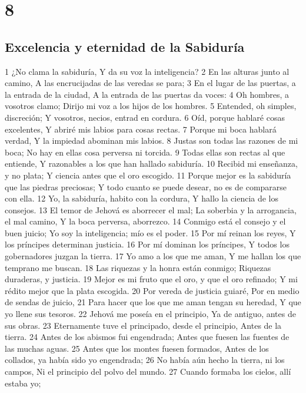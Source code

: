 \chapter{8}

\section*{Excelencia y eternidad de la Sabiduría}

1 ¿No clama la sabiduría,
Y da su voz la inteligencia?
2 En las alturas junto al camino,
A las encrucijadas de las veredas se para;
3 En el lugar de las puertas, a la entrada de la ciudad,
A la entrada de las puertas da voces: 
4 Oh hombres, a vosotros clamo;
Dirijo mi voz a los hijos de los hombres.
5 Entended, oh simples, discreción;
Y vosotros, necios, entrad en cordura.
6 Oíd, porque hablaré cosas excelentes,
Y abriré mis labios para cosas rectas. 
7 Porque mi boca hablará verdad,
Y la impiedad abominan mis labios.
8 Justas son todas las razones de mi boca;
No hay en ellas cosa perversa ni torcida.
9 Todas ellas son rectas al que entiende,
Y razonables a los que han hallado sabiduría.
10 Recibid mi enseñanza, y no plata;
Y ciencia antes que el oro escogido.
11 Porque mejor es la sabiduría que las piedras preciosas;
Y todo cuanto se puede desear, no es de compararse con ella.
12 Yo, la sabiduría, habito con la cordura,
Y hallo la ciencia de los consejos.
13 El temor de Jehová es aborrecer el mal;
La soberbia y la arrogancia, el mal camino,
Y la boca perversa, aborrezco.
14 Conmigo está el consejo y el buen juicio;
Yo soy la inteligencia; mío es el poder.
15 Por mí reinan los reyes,
Y los príncipes determinan justicia.
16 Por mí dominan los príncipes,
Y todos los gobernadores juzgan la tierra.
17 Yo amo a los que me aman,
Y me hallan los que temprano me buscan.
18 Las riquezas y la honra están conmigo;
Riquezas duraderas, y justicia.
19 Mejor es mi fruto que el oro, y que el oro refinado;
Y mi rédito mejor que la plata escogida.
20 Por vereda de justicia guiaré,
Por en medio de sendas de juicio,
21 Para hacer que los que me aman tengan su heredad,
Y que yo llene sus tesoros.
22 Jehová me poseía en el principio,
Ya de antiguo, antes de sus obras. 
23 Eternamente tuve el principado, desde el principio,
Antes de la tierra.
24 Antes de los abismos fui engendrada;
Antes que fuesen las fuentes de las muchas aguas.
25 Antes que los montes fuesen formados,
Antes de los collados, ya había sido yo engendrada;
26 No había aún hecho la tierra, ni los campos,
Ni el principio del polvo del mundo.
27 Cuando formaba los cielos, allí estaba yo;
